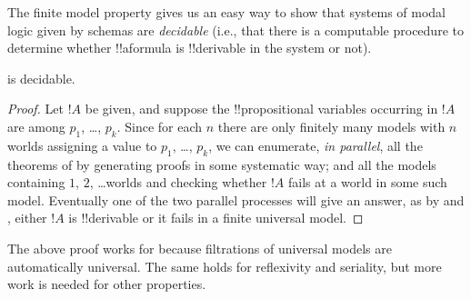 \documentclass[../../../include/open-logic-section]{subfiles}
\begin{document}

The finite model property gives us an easy way to show that systems of
modal logic given by schemas are \emph{decidable} (i.e., that there is
a computable procedure to determine whether !!a{formula} is !!{derivable} in
the system or not).

\begin{thm}
   is decidable.
\end{thm}

\begin{proof}
  Let $!A$ be given, and suppose the !!{propositional variable}s
  occurring in $!A$ are among $p_1$, \dots, $p_k$.  Since for each
  $n$ there are only finitely many models with $n$ worlds assigning a
  value to $p_1$, \dots, $p_k$, we can enumerate, \emph{in parallel}, all
  the theorems of  by generating proofs in some systematic
  way; and all the models containing $1$, $2$, \dots worlds and checking
  whether $!A$ fails at a world in some such model. Eventually
  one of the two parallel processes will give an answer, as by
   and , either
  $!A$ is !!{derivable} or it fails in a finite universal model.
\end{proof}

The above proof works for  because filtrations of universal
models are automatically universal. The same holds for reflexivity and
seriality, but more work is needed for other properties.
\end{document}
